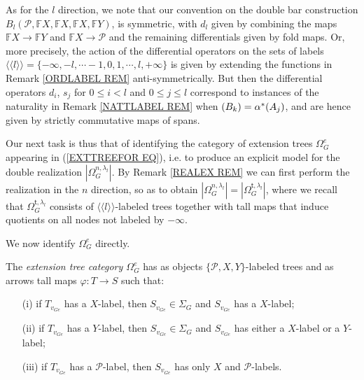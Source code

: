 \documentclass[a4paper,10pt]{article}%
\begin{document}
As for the $l$ direction, we note that our convention on 
the double bar construction 
$B_l(\mathcal{P}, \mathbb{F}X, \mathbb{F}X, \mathbb{F}X, \mathbb{F} Y)$,
is symmetric, 
with $d_l$ given by combining the maps
$\mathbb{F}X \to \mathbb{F} Y$ 
and 
$\mathbb{F}X \to \mathcal{P}$
and the remaining differentials given by fold maps.
Or, more precisely, the action of the differential operators
on the sets of labels
$\langle \langle l \rangle \rangle = 
\{-\infty,-l, \cdots -1,0,1,\cdots,l,+\infty\}$
is given by extending the functions in 
Remark \ref{ORDLABEL REM} anti-symmetrically.
But then the differential operators 
$d_i$, $s_j$ for $0\leq i<l$ and $0\leq j \leq l$
correspond to instances of the naturality in 
Remark \ref{NATTLABEL REM}
when $(B_k) =\alpha^{\**}(A_j)$,
and are hence given by strictly commutative maps of spans.

Our next task is thus that of identifying the category of extension trees $\Omega_G^e$ appearing
in (\ref{EXTTREEFOR EQ}),
i.e. to produce an explicit model for the double realization
$|\Omega_G^{n,\lambda_l}|$.
By Remark \ref{REALEX REM}
we can first perform the realization in the $n$ direction, so as to obtain
$|\Omega_G^{n,\lambda_l}|=|\Omega_G^{\mathsf{t},\lambda_l}|$,
where we recall that 
$\Omega_G^{\mathsf{t},\lambda_l}$
consists of $\langle \langle l \rangle \rangle$-labeled trees
together with tall maps that induce quotients on all nodes not labeled by $-\infty$.

We now identify $\Omega_G^{e}$ directly.


\begin{definition}\label{EXTTREECAT DEF}
	The \textit{extension tree category $\Omega_G^e$}
	has as objects $\{\mathcal{P},X,Y\}$-labeled trees
	and as arrows tall maps $\varphi \colon T \to S$ such that:
	\begin{itemize}
		\item[(i)] if $T_{v_{Ge}}$ has a $X$-label, then 
		$S_{v_{Ge}} \in \Sigma_G$ and $S_{v_{Ge}}$ has a $X$-label;
		\item[(ii)] if $T_{v_{Ge}}$ has a $Y$-label, then 
		$S_{v_{Ge}} \in \Sigma_G$ and $S_{v_{Ge}}$ has either a $X$-label or a $Y$-label;
		\item[(iii)] if $T_{v_{Ge}}$ has a $\mathcal{P}$-label, then 
		$S_{v_{Ge}}$ has only $X$ and $\mathcal{P}$-labels.
	\end{itemize}
\end{definition}
\end{document}
